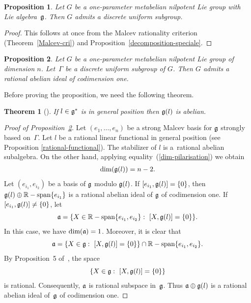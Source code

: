 \documentclass[11pt]{article}
\newtheorem{theorem}{Theorem}
\newtheorem{proposition}{Proposition}
\providecommand{\mathds}[1]{\mathbb{#1}}
\newcommand{\set}[1]{\left\{#1\right\}}
\DeclareMathOperator{\spann}{\mathds{R}-span}
\def\hb#1{\hbox{#1}}
\def\hb #1{\hbox{#1}}
\def\hb#1{\hbox{#1}}
\def\dim#1{\hb{dim}(#1)}
\begin{document}
\begin{proposition}
Let $G$ be a one-parameter metabelian nilpotent Lie group with Lie
algebra~$\frak g$.
 Then $G$ admits a discrete uniform subgroup.
\end{proposition}

\begin{proof} This follows at once from
 the  Malcev  rationality criterion
 (Theorem~\ref{Malcev-cri}) and Proposition~\ref{decomposition-speciale}.
 \end{proof}

\begin{proposition}\label{maryem10}
Let $G$ be a one-parameter metabelian nilpotent Lie group of
dimension $n$.
 Let~$\Gamma $ be a discrete uniform subgroup of $G$. Then $G$ admits a
rational
 abelian ideal of codimension one.
\end{proposition}

Before proving the proposition, we need the following theorem.
\begin{theorem}[]
If $l\in \frak g^*$ is in general position then $\frak g(l)$ is
abelian.
\end{theorem}

\begin{proof}[Proof of Proposition~\ref{maryem10}]
Let $(e_1, \ldots, e_{n})$ be a strong Malcev basis for $\frak g$
strongly based on~$\Gamma$. Let $l$ be a rational  linear functional
in general position (see Proposition \ref{rational-functional}).
 The stabilizer of $l$ is a~rational abelian  subalgebra. On the other hand, applying equality~(\ref{dim-pilarisation}) we obtain
\begin{gather}\label{dim-stab}
\dim{\frak g(l)}=
 n-2.
 \end{gather}
  Let $(e_{i_1}, e_{i_2})$  be a basis of
$\frak g$ modulo $\frak g(l)$. If $ [ e_{i_1}, \frak g(l)] = \lbrace
0\rbrace$, then $\frak g(l)\oplus \spann\lbrace e_{i_1}\rbrace$  is
a rational abelian ideal of $\frak g$ of codimension one. If $ [
e_{i_1}, \frak g(l)] \ne \lbrace 0 \rbrace$, let
\[
\frak a = \lbrace X \in \spann\lbrace e_{i_1}, e_{i_2}\rbrace:\
[ X, \frak g(l)] =\set{0}\rbrace.
\] In this case, we have $\dim
{\frak a} =1$. Moreover, it is clear that
\[
 \frak a = \lbrace X \in \frak g:\
[ X, \frak g(l)] =\set{0}\rbrace\cap \spann\lbrace e_{i_1},
e_{i_2}\rbrace.
\]
 By Proposition~5 of~\cite{Ghorbel1}, the space
\[
\lbrace X \in \frak g:\
[ X, \frak g(l)] =\set{0}\rbrace
\] is rational. Consequently, $\frak
a$ is rational subspace in~$\frak g$. Thus $\frak a \oplus \frak
g(l)$ is a rational abelian ideal of~$\frak g$ of codimension one.
\end{proof}
\setcounter{section}{4}
\setcounter{subsection}{0}
\setcounter{subsubsection}{0}
\setcounter{equation}{5}
\end{document}
